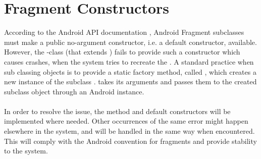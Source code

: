 
\section{Fragment Constructors}
\label{sec:fragment_constructors}

According to the Android API documentation \parencite{android_dev_fragment}, Android Fragment subclasses must make a public no-argument constructor, i.e. a default constructor, available. However, the \giraf-class  (that extends ) fails to provide such a constructor which causes crashes, when the system tries to recreate the . A standard practice when sub classing  objects is to provide a static factory method, called , which creates a new instance of the  subclass \parencite{android_dev_fragment}.  takes its arguments and passes them to the created  subclass object through an Android  instance.
\\\\
In order to resolve the issue, the  method and default constructors will be implemented where needed. Other occurrences of the same error might happen elsewhere in the system, and will be handled in the same way when encountered. This will comply with the Android convention for fragments and provide stability to the system.